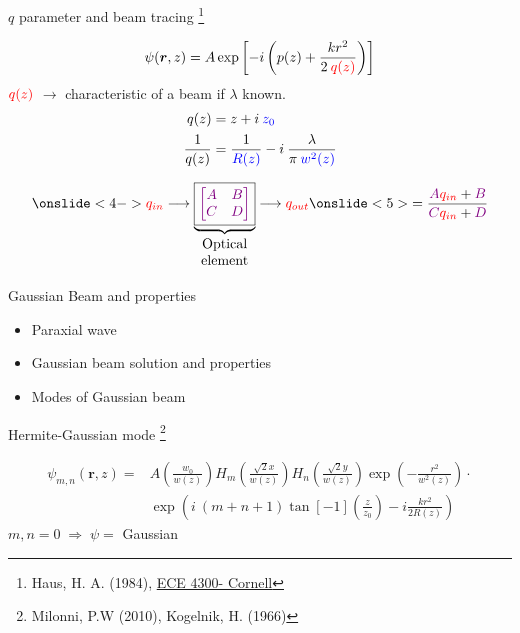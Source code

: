 \documentclass[12pt, dvipsnames]{beamer}
\numberwithin{equation}{section}
\newcommand\blfootnote[1]{%
	\begingroup
	\renewcommand\thefootnote{}\footnote{#1}%
	\addtocounter{footnote}{-1}%
	\endgroup
}
\begin{document}
\begin{frame}[t]{$q$ parameter and beam tracing}\blfootnote{Haus, H. A. (1984), \href{https://www.youtube.com/playlist?list=PLyWzPf87clvEb8T3Xf30tMaUqdbVchrNY}{ECE 4300- Cornell}}
	\vspace{-12pt}
	$$\psi(\boldsymbol{r},z)= A \exp\left[-i\left(p(z) + \frac{kr^2}{2\:{\color{red}q(z)}}\right)\right]$$\pause
	$\color{red}q(z)$ $\longrightarrow$ characteristic of a beam if $\lambda$ known.\pause
	\begin{align*}
		q(z) &= z + i\:\color{blue}z_0\\
		\frac{1}{q(z)} &= \frac{1}{\color{blue}R(z)} - i\: \frac{\lambda}{\pi\: \color{blue}w^2(z)}
	\end{align*}\pause

\begin{align*}\onslide<4->{{\color{red}q_{in}}\longrightarrow
	\underbrace{\boxed{\color{violet}{\begin{bmatrix}
		A&B\\
		C&D
	\end{bmatrix}}}}_{\begin{matrix}\text{Optical}\\ \text{element} \end{matrix}}
	\longrightarrow {\color{red}q_{out}}} \onslide<5>{= \frac{{\color{violet}A} {\color{red}q_{in}}+{\color{violet}B}}{{\color{violet}C} {\color{red}q_{in}}+ {\color{violet}D}}}
\end{align*}
\end{frame}

\begin{frame}%
	\centering
	\alert{\huge Gaussian Beam and properties}
	\begin{itemize}\Large
		\item<0>Paraxial wave
		\item<0>Gaussian beam solution and properties
		\item<1>Modes of Gaussian beam
	\end{itemize}
\end{frame}

\begin{frame}[c]{Hermite-Gaussian mode}\blfootnote{Milonni, P.W (2010), Kogelnik, H. (1966)}
	\begin{align*}
		\psi_{m,n}(\boldsymbol{r},z)=& A \left(\frac{w_0}{w(z)}\right) H_m\left(\frac{\sqrt{2} x}{w(z)}\right) H_n\left(\frac{\sqrt{2} y}{w(z)}\right)\exp( -\frac{r^2}{w^2(z)}) \cdot\nonumber\\ 
		&\exp( i\:(m+n+1)\tan[-1](\frac{z}{z_0}) -i\frac{kr^2}{2R(z)})
	\end{align*}\pause
	$m,n=0\;\Rightarrow\;\psi=$ \alert{Gaussian}
\end{frame}
\end{document}
